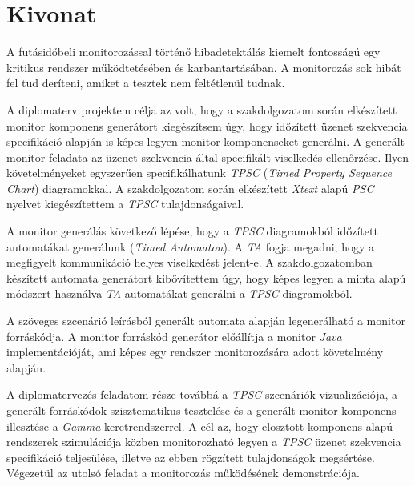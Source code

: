 \setcounter{page}{1}

\selecthungarian

\chapter*{Kivonat}

A futásidőbeli monitorozással történő hibadetektálás kiemelt fontosságú egy kritikus rendszer működtetésében és karbantartásában.
A monitorozás sok hibát fel tud deríteni, amiket a tesztek nem feltétlenül tudnak.

A diplomaterv projektem célja az volt, hogy a szakdolgozatom során elkészített monitor komponens generátort kiegészítsem úgy, hogy időzített üzenet szekvencia specifikáció alapján is képes legyen monitor komponenseket generálni.
A generált monitor feladata az üzenet szekvencia által specifikált viselkedés ellenőrzése.
Ilyen követelményeket egyszerűen specifikálhatunk \textit{TPSC} (\textit{Timed Property Sequence Chart}) diagramokkal.
A szakdolgozatom során elkészített \textit{Xtext} alapú \textit{PSC} nyelvet kiegészítettem a \textit{TPSC} tulajdonságaival.

A monitor generálás következő lépése, hogy a \textit{TPSC} diagramokból időzített automatákat generálunk (\textit{Timed Automaton}).
A \textit{TA} fogja megadni, hogy a megfigyelt kommunikáció helyes viselkedést jelent-e.
A szakdolgozatomban készített automata generátort kibővítettem úgy, hogy képes legyen a minta alapú módszert használva \textit{TA} automatákat generálni a \textit{TPSC} diagramokból.

A szöveges szcenárió leírásból generált automata alapján legenerálható a monitor forráskódja.
A monitor forráskód generátor előállítja a monitor \textit{Java} implementációját, ami képes egy rendszer monitorozására adott követelmény alapján.

A diplomatervezés feladatom része továbbá a \textit{TPSC} szcenáriók vizualizációja, a generált forráskódok szisztematikus tesztelése és a generált monitor komponens illesztése a \textit{Gamma} keretrendszerrel.
A cél az, hogy elosztott komponens alapú rendszerek szimulációja közben monitorozható legyen a \textit{TPSC} üzenet szekvencia specifikáció teljesülése, illetve az ebben rögzített tulajdonságok megsértése.
Végezetül az utolsó feladat a monitorozás működésének demonstrációja.

